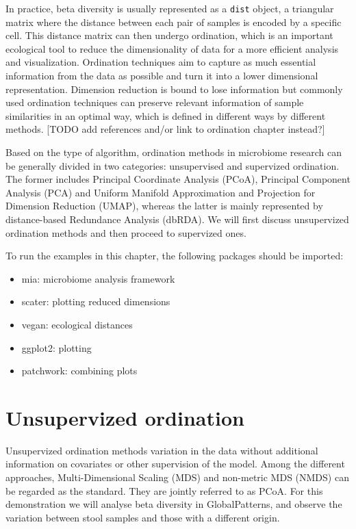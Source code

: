 \documentclass[
]{book}
\providecommand{\tightlist}{%
  \setlength{\itemsep}{0pt}\setlength{\parskip}{0pt}}
\begin{document}
In practice, beta diversity is usually represented as a \texttt{dist} object, a
triangular matrix where the distance between each pair of samples is encoded by
a specific cell. This distance matrix can then undergo ordination, which is an
important ecological tool to reduce the dimensionality of data for a more
efficient analysis and visualization. Ordination techniques aim to capture as
much essential information from the data as possible and turn it into a lower
dimensional representation. Dimension reduction is bound to lose information but
commonly used ordination techniques can preserve relevant information of sample
similarities in an optimal way, which is defined in different ways by different
methods. {[}TODO add references and/or link to ordination chapter instead?{]}

Based on the type of algorithm, ordination methods in microbiome research can
be generally divided in two categories: unsupervised and supervized ordination.
The former includes Principal Coordinate Analysis (PCoA), Principal Component
Analysis (PCA) and Uniform Manifold Approximation and Projection for Dimension
Reduction (UMAP), whereas the latter is mainly represented by distance-based
Redundance Analysis (dbRDA). We will first discuss unsupervized ordination
methods and then proceed to supervized ones.

To run the examples in this chapter, the following packages should be imported:

\begin{itemize}
\tightlist
\item
  mia: microbiome analysis framework
\item
  scater: plotting reduced dimensions
\item
  vegan: ecological distances
\item
  ggplot2: plotting
\item
  patchwork: combining plots
\end{itemize}

\hypertarget{unsupervized-ordination}{%
\section{Unsupervized ordination}\label{unsupervized-ordination}}

Unsupervized ordination methods variation in the data without additional
information on covariates or other supervision of the model. Among the different
approaches, Multi-Dimensional Scaling (MDS) and non-metric MDS (NMDS) can be
regarded as the standard. They are jointly referred to as PCoA. For this
demonstration we will analyse beta diversity in GlobalPatterns, and observe the
variation between stool samples and those with a different origin.
\end{document}
